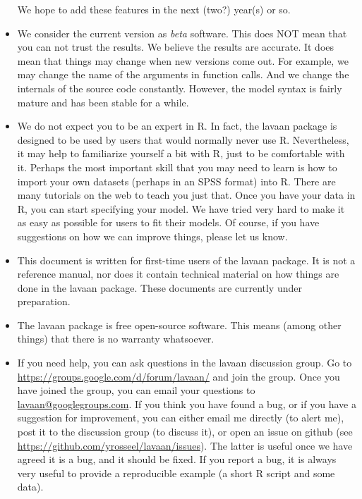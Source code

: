 \begin{itemize}
  We hope to add these features in the next (two?) year(s) or so.
\item
  We consider the current version as \emph{beta} software. This does NOT
  mean that you can not trust the results. We believe the results are
  accurate. It does mean that things may change when new versions come
  out. For example, we may change the name of the arguments in function
  calls. And we change the internals of the source code constantly.
  However, the model syntax is fairly mature and has been stable for a
  while.
\item
  We do not expect you to be an expert in R. In fact, the lavaan package
  is designed to be used by users that would normally never use R.
  Nevertheless, it may help to familiarize yourself a bit with R, just
  to be comfortable with it. Perhaps the most important skill that you
  may need to learn is how to import your own datasets (perhaps in an
  SPSS format) into R. There are many tutorials on the web to teach you
  just that. Once you have your data in R, you can start specifying your
  model. We have tried very hard to make it as easy as possible for
  users to fit their models. Of course, if you have suggestions on how
  we can improve things, please let us know.
\item
  This document is written for first-time users of the lavaan package.
  It is not a reference manual, nor does it contain technical material
  on how things are done in the lavaan package. These documents are
  currently under preparation.
\item
  The lavaan package is free open-source software. This means (among
  other things) that there is no warranty whatsoever.
\item
  If you need help, you can ask questions in the lavaan discussion
  group. Go to \url{https://groups.google.com/d/forum/lavaan/} and join
  the group. Once you have joined the group, you can email your
  questions to
  \href{mailto:lavaan@googlegroups.com}{lavaan@googlegroups.com}. If you
  think you have found a bug, or if you have a suggestion for
  improvement, you can either email me directly (to alert me), post it
  to the discussion group (to discuss it), or open an issue on github
  (see \url{https://github.com/yrosseel/lavaan/issues}). The latter is
  useful once we have agreed it is a bug, and it should be fixed. If you
  report a bug, it is always very useful to provide a reproducible
  example (a short R script and some data).
\end{itemize}
